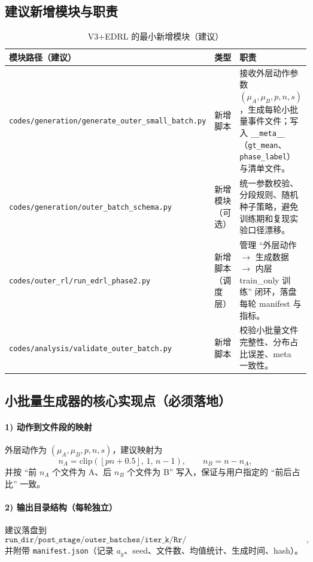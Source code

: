 \documentclass[UTF8,11pt,a4paper]{ctexart}
\begin{document}
\subsection{建议新增模块与职责}
\begin{table}[H]
\centering
\caption{V3+EDRL 的最小新增模块（建议）}
\begin{tabular}{p{4.2cm}p{3.2cm}p{7.4cm}}
\toprule
模块路径（建议） & 类型 & 职责 \\
\midrule
\texttt{codes/generation/generate\_outer\_small\_batch.py} & 新增脚本 & 接收外层动作参数 $(\mu_A,\mu_B,p,n,s)$，生成每轮小批量事件文件；写入 \texttt{\_\_meta\_\_}（\texttt{gt\_mean}、\texttt{phase\_label}）与清单文件。\\
\texttt{codes/generation/outer\_batch\_schema.py} & 新增模块（可选） & 统一参数校验、分段规则、随机种子策略，避免训练期和复现实验口径漂移。\\
\texttt{codes/outer\_rl/run\_edrl\_phase2.py} & 新增脚本（调度层） & 管理 ``外层动作 $\to$ 生成数据 $\to$ 内层 train\_only 训练'' 闭环，落盘每轮 manifest 与指标。\\
\texttt{codes/analysis/validate\_outer\_batch.py} & 新增脚本 & 校验小批量文件完整性、分布占比误差、meta 一致性。\\
\bottomrule
\end{tabular}
\end{table}

\subsection{小批量生成器的核心实现点（必须落地）}
\paragraph{1) 动作到文件段的映射}
外层动作为 $(\mu_A,\mu_B,p,n,s)$，建议映射为
\begin{equation}
n_A=\mathrm{clip}\!\left(\left\lfloor p n + 0.5\right\rfloor,\,1,\,n-1\right),\qquad n_B=n-n_A,
\end{equation}
并按 ``前 $n_A$ 个文件为 A、后 $n_B$ 个文件为 B'' 写入，保证与用户指定的 ``前后占比'' 一致。

\paragraph{2) 输出目录结构（每轮独立）}
建议落盘到
\begin{equation}
\texttt{run\_dir/post\_stage/outer\_batches/iter\_k/Rr/Intermodal\_EGS\_data\_dynamic\_congestion\{i\}.xlsx},
\end{equation}
并附带 \texttt{manifest.json}（记录 $a_g$、seed、文件数、均值统计、生成时间、hash）。
\end{document}
